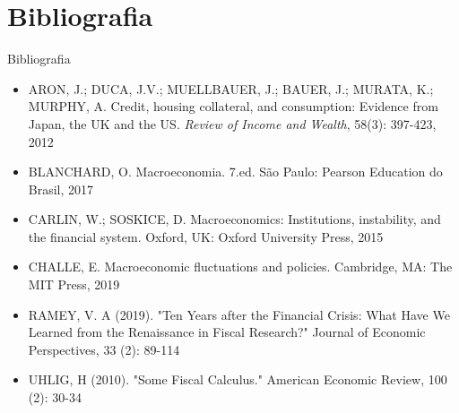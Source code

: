 \documentclass[10pt]{beamer}
\begin{document}
\section{Bibliografia}
\begin{frame}{ Bibliografia}
    \begin{itemize}        
        \item ARON, J.; DUCA, J.V.; MUELLBAUER, J.; BAUER, J.; MURATA, K.; MURPHY, A. Credit, housing collateral, and consumption: Evidence from Japan, the UK and the US. \emph{Review of Income and Wealth}, 58(3): 397-423, 2012\medskip
        \item BLANCHARD, O. Macroeconomia. 7.ed. São Paulo: Pearson Education do Brasil, 2017\medskip                
        \item CARLIN, W.; SOSKICE, D. Macroeconomics: Institutions, instability, and the financial system. Oxford, UK: Oxford University Press, 2015\medskip
        \item CHALLE, E. Macroeconomic fluctuations and policies. Cambridge, MA: The MIT Press, 2019\medskip        
        \item RAMEY, V. A (2019). "Ten Years after the Financial Crisis: What Have We Learned from the Renaissance in Fiscal Research?" Journal of Economic Perspectives, 33 (2): 89-114\medskip
        \item UHLIG, H (2010). "Some Fiscal Calculus." American Economic Review, 100 (2): 30-34
    \end{itemize}
\end{frame}
\end{document}
